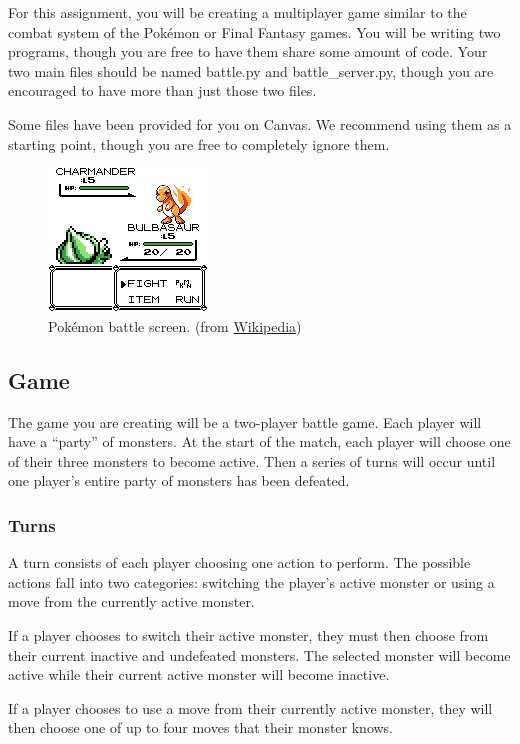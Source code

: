 \documentclass[11pt]{cselabheader}
\begin{document}
For this assignment, you will be creating a multiplayer game similar to the
combat system of the Pok\'emon or Final Fantasy games. You will be writing
two programs, though you are free to have them share some amount of code.
Your two main files should be named battle.py and battle\_server.py, though
you are encouraged to have more than just those two files.

Some files have been provided for you on Canvas. We recommend using them as
a starting point, though you are free to completely ignore them.

\begin{figure}[h]
  \centering
  \includegraphics{img/Bulbasaur_pokemon_red}
  \caption{Pok\'emon battle screen. (from
    \href{http://en.wikipedia.org/wiki/File:Bulbasaur_pokemon_red.png}{Wikipedia})}
  \label{poke}
\end{figure}

\subsection{Game}
The game you are creating will be a two-player battle game. Each player will
have a ``party'' of monsters. At the start of the match, each player will choose
one of their three monsters to become active. Then a series of turns will occur
until one player's entire party of monsters has been defeated.

\subsubsection{Turns}
\label{subsubsec:turn}
A turn consists of each player choosing one action to perform. The possible
actions fall into two categories: switching the player's active monster or using
a move from the currently active monster.

If a player chooses to switch their active monster, they must then choose from
their current inactive and undefeated monsters. The selected monster will become
active while their current active monster will become inactive.

If a player chooses to use a move from their currently active monster, they will
then choose one of up to four moves that their monster knows.
\end{document}
